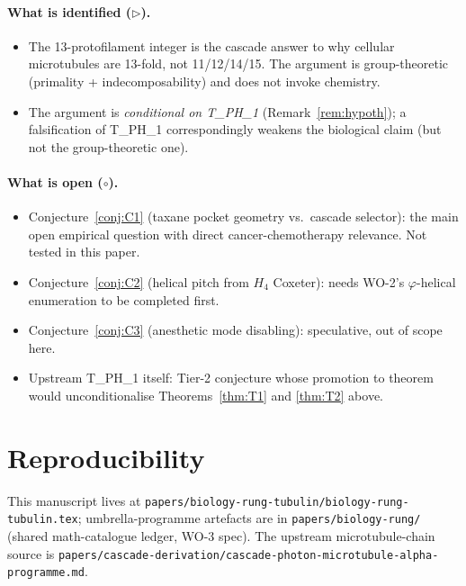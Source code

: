 \documentclass[12pt]{article}
\newcommand{\phig}{\varphi}
\begin{document}
\paragraph{What is identified ($\triangleright$).}
\begin{itemize}
\item The 13-protofilament integer is the cascade answer to why
  cellular microtubules are 13-fold, not 11/12/14/15. The
  argument is group-theoretic (primality + indecomposability) and
  does not invoke chemistry.
\item The argument is \emph{conditional on T\_PH\_1}
  (Remark~\ref{rem:hypoth}); a falsification of T\_PH\_1
  correspondingly weakens the biological claim (but not the
  group-theoretic one).
\end{itemize}

\paragraph{What is open ($\circ$).}
\begin{itemize}
\item Conjecture~\ref{conj:C1} (taxane pocket geometry vs.\
  cascade selector): the main open empirical question with direct
  cancer-chemotherapy relevance. Not tested in this paper.
\item Conjecture~\ref{conj:C2} (helical pitch from $H_4$
  Coxeter): needs WO-2's $\phig$-helical enumeration to be
  completed first.
\item Conjecture~\ref{conj:C3} (anesthetic mode disabling):
  speculative, out of scope here.
\item Upstream T\_PH\_1 itself: Tier-2 conjecture whose promotion
  to theorem would unconditionalise Theorems~\ref{thm:T1} and
  \ref{thm:T2} above.
\end{itemize}

\section{Reproducibility}\label{sec:repro}

This manuscript lives at
\texttt{papers/biology-rung-tubulin/biology-rung-tubulin.tex};
umbrella-programme artefacts are in \texttt{papers/biology-rung/}
(shared math-catalogue ledger, WO-3 spec). The upstream
microtubule-chain source is
\texttt{papers/cascade-derivation/cascade-photon-microtubule-alpha-programme.md}.
\end{document}
